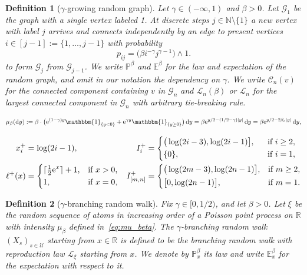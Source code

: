 \documentclass[10pt,a4paper]{amsart}
\newtheorem{definition}{Definition}
\newcommand{\E}{\mathbb E}
\newcommand{\N}{{\mathbb N}}
\newcommand{\Prob}{\mathbb{P}}
\newcommand{\R}{{\mathbb R}}
\newcommand{\ind}[1]{\mathbbm{1}_{\{#1\}}}
\newcommand{\rd}{\mathrm{d}}
\newcommand{\re}{{\mathrm e}}
\newcommand{\sC}{{\mathscr C}}
\newcommand{\sG}{{\mathscr G}}
\newcommand{\sL}{{\mathscr L}}
\begin{document}
\begin{definition}[$\gamma$-growing random graph]\label{def:pa-ann}
	Let $\gamma\in(-\infty,1)$ and $\beta>0$. Let $\sG_1$ be the graph with a single vertex labeled 1. At discrete steps  $j\in\N\setminus\{1\}$ a new vertex with label $j$ arrives and connects independently by an edge to present vertices $i\in[j-1]:=\{1,\ldots,j-1\}$  with probability
    \begin{equation}\label{eq:conn-prob2}
     p_{ij} = \big(\beta i^{-\gamma}j^{\gamma-1}\big)\wedge 1.
    \end{equation}
	to form $\sG_j$ from $\sG_{j-1}$. 
    We write $\Prob^{\beta}$ and $\E^\beta$ for the law and expectation of the random graph, and omit in our notation the dependency on $\gamma$.
    We write $\sC_n(v)$ for the connected component containing $v$ in $\sG_n$ and $\sL_n(\beta)$ or $\sL_n$ for the largest connected component in $\sG_n$ with arbitrary tie-breaking rule. 
    \end{definition}

\begin{equation}
	\label{eq:mu_beta}
	\mu_\beta(\rd y) := \beta\cdot \big(\re^{(1-\gamma)y}\ind{y<0}+ \re^{\gamma y}\ind{y\ge 0}\big)\,\rd y = \beta \re^{y/2 - (1/2-\gamma)|y|}\,\rd y = \beta \re^{y/2 - 2\beta_c|y|}\,\rd y,
\end{equation}

\begin{equation}\label{eq:i-upper}
\begin{aligned}
x^+_i&=\log(2i-1), 
	&I_i^+&=
    \begin{dcases}
        \big(\log(2i-3), \log(2i-1)\big],\phantom{..}&\text{if }i\ge2,\\
        \{0\},&\text{if }i=1,
    \end{dcases}\\
    \ell^+(x)&=\begin{dcases}\lceil \tfrac{1}{2}\re^x\rceil+1,&\text{if }x>0,\\
    1,&\text{if }x=0,\end{dcases}
    &I^+_{[m,n]}&=\begin{dcases}
        \big(\log(2m-3),\log(2n-1)\big],&\text{if }m\ge2,\\
       \big [0,\log(2n-1)\big],&\text{if }m=1.
    \end{dcases}
    \end{aligned}
\end{equation}

\begin{definition}[$\gamma$-branching random walk]\label{def:pa-brw}
	Fix $\gamma\in[0, 1/2)$, and let $\beta>0$. Let $\xi$ be the random sequence of atoms in increasing order of a Poisson point process on $\R$ with intensity $\mu_\beta$ defined in~\eqref{eq:mu_beta}. The $\gamma$-branching random walk $(X_s)_{s\in\mathcal U}$ starting from $x\in\R$ is defined to be the branching random walk with reproduction law $\mathcal L_\xi$ starting from $x$. We denote by $\Prob_x^\beta$ its law and write $\E_x^\beta$ for the expectation with respect to it.
\end{definition}
\end{document}
